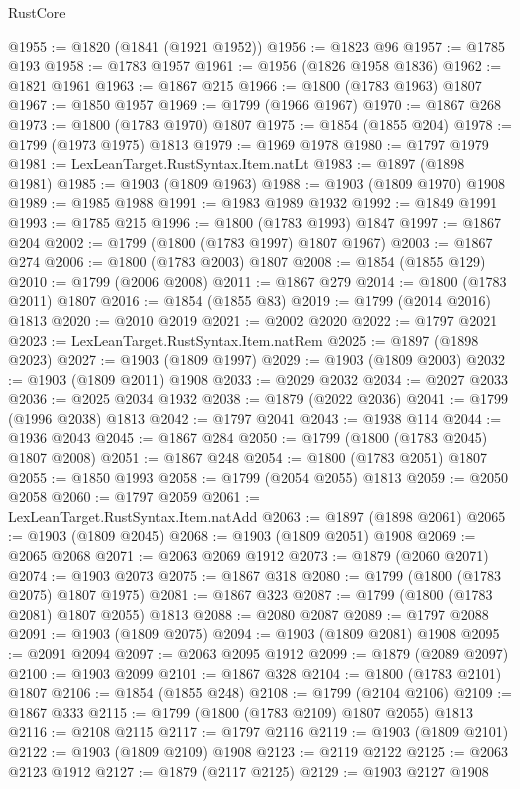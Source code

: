 \begin{lexlean}{RustCore}
\begin{coremodule}
@1955 := @1820 (@1841 (@1921 @1952))
@1956 := @1823 @96
@1957 := @1785 @193
@1958 := @1783 @1957
@1961 := @1956 (@1826 @1958 @1836)
@1962 := @1821 @1961
@1963 := @1867 @215
@1966 := @1800 (@1783 @1963) @1807
@1967 := @1850 @1957
@1969 := @1799 (@1966 @1967)
@1970 := @1867 @268
@1973 := @1800 (@1783 @1970) @1807
@1975 := @1854 (@1855 @204)
@1978 := @1799 (@1973 @1975) @1813
@1979 := @1969 @1978
@1980 := @1797 @1979
@1981 := LexLeanTarget.RustSyntax.Item.natLt
@1983 := @1897 (@1898 @1981)
@1985 := @1903 (@1809 @1963)
@1988 := @1903 (@1809 @1970) @1908
@1989 := @1985 @1988
@1991 := @1983 @1989 @1932
@1992 := @1849 @1991
@1993 := @1785 @215
@1996 := @1800 (@1783 @1993) @1847
@1997 := @1867 @204
@2002 := @1799 (@1800 (@1783 @1997) @1807 @1967)
@2003 := @1867 @274
@2006 := @1800 (@1783 @2003) @1807
@2008 := @1854 (@1855 @129)
@2010 := @1799 (@2006 @2008)
@2011 := @1867 @279
@2014 := @1800 (@1783 @2011) @1807
@2016 := @1854 (@1855 @83)
@2019 := @1799 (@2014 @2016) @1813
@2020 := @2010 @2019
@2021 := @2002 @2020
@2022 := @1797 @2021
@2023 := LexLeanTarget.RustSyntax.Item.natRem
@2025 := @1897 (@1898 @2023)
@2027 := @1903 (@1809 @1997)
@2029 := @1903 (@1809 @2003)
@2032 := @1903 (@1809 @2011) @1908
@2033 := @2029 @2032
@2034 := @2027 @2033
@2036 := @2025 @2034 @1932
@2038 := @1879 (@2022 @2036)
@2041 := @1799 (@1996 @2038) @1813
@2042 := @1797 @2041
@2043 := @1938 @114
@2044 := @1936 @2043
@2045 := @1867 @284
@2050 := @1799 (@1800 (@1783 @2045) @1807 @2008)
@2051 := @1867 @248
@2054 := @1800 (@1783 @2051) @1807
@2055 := @1850 @1993
@2058 := @1799 (@2054 @2055) @1813
@2059 := @2050 @2058
@2060 := @1797 @2059
@2061 := LexLeanTarget.RustSyntax.Item.natAdd
@2063 := @1897 (@1898 @2061)
@2065 := @1903 (@1809 @2045)
@2068 := @1903 (@1809 @2051) @1908
@2069 := @2065 @2068
@2071 := @2063 @2069 @1912
@2073 := @1879 (@2060 @2071)
@2074 := @1903 @2073
@2075 := @1867 @318
@2080 := @1799 (@1800 (@1783 @2075) @1807 @1975)
@2081 := @1867 @323
@2087 := @1799 (@1800 (@1783 @2081) @1807 @2055) @1813
@2088 := @2080 @2087
@2089 := @1797 @2088
@2091 := @1903 (@1809 @2075)
@2094 := @1903 (@1809 @2081) @1908
@2095 := @2091 @2094
@2097 := @2063 @2095 @1912
@2099 := @1879 (@2089 @2097)
@2100 := @1903 @2099
@2101 := @1867 @328
@2104 := @1800 (@1783 @2101) @1807
@2106 := @1854 (@1855 @248)
@2108 := @1799 (@2104 @2106)
@2109 := @1867 @333
@2115 := @1799 (@1800 (@1783 @2109) @1807 @2055) @1813
@2116 := @2108 @2115
@2117 := @1797 @2116
@2119 := @1903 (@1809 @2101)
@2122 := @1903 (@1809 @2109) @1908
@2123 := @2119 @2122
@2125 := @2063 @2123 @1912
@2127 := @1879 (@2117 @2125)
@2129 := @1903 @2127 @1908

\end{coremodule}
\end{lexlean}
